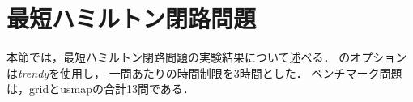 



\section{最短ハミルトン閉路問題}


本節では，最短ハミルトン閉路問題の実験結果について述べる．
{\clingo}のオプションは\textit{trendy}を使用し，
一問あたりの時間制限を3時間とした．
ベンチマーク問題は，\textsf{grid}と\textsf{usmap}の合計13問である．

